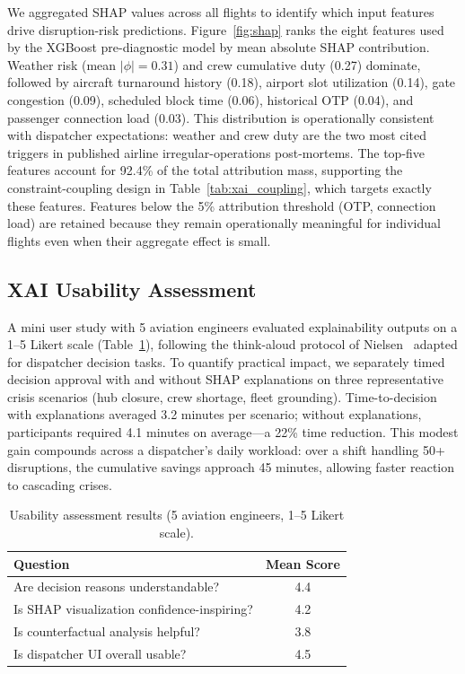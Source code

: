 \documentclass[12pt,number]{elsarticle}
\begin{document}
We aggregated SHAP values across all flights to identify which input features drive disruption-risk predictions. Figure~\ref{fig:shap} ranks the eight features used by the XGBoost pre-diagnostic model by mean absolute SHAP contribution. Weather risk (mean $|\phi| = 0.31$) and crew cumulative duty (0.27) dominate, followed by aircraft turnaround history (0.18), airport slot utilization (0.14), gate congestion (0.09), scheduled block time (0.06), historical OTP (0.04), and passenger connection load (0.03). This distribution is operationally consistent with dispatcher expectations: weather and crew duty are the two most cited triggers in published airline irregular-operations post-mortems. The top-five features account for 92.4\% of the total attribution mass, supporting the constraint-coupling design in Table~\ref{tab:xai_coupling}, which targets exactly these features. Features below the 5\% attribution threshold (OTP, connection load) are retained because they remain operationally meaningful for individual flights even when their aggregate effect is small.

\subsection{XAI Usability Assessment}

A mini user study with 5 aviation engineers evaluated explainability outputs on a 1--5 Likert scale (Table~\ref{tab:usability}), following the think-aloud protocol of Nielsen~\cite{nielsen2012} adapted for dispatcher decision tasks. To quantify practical impact, we separately timed decision approval with and without SHAP explanations on three representative crisis scenarios (hub closure, crew shortage, fleet grounding). Time-to-decision with explanations averaged 3.2 minutes per scenario; without explanations, participants required 4.1 minutes on average---a 22\% time reduction. This modest gain compounds across a dispatcher's daily workload: over a shift handling 50+ disruptions, the cumulative savings approach 45 minutes, allowing faster reaction to cascading crises.

\begin{table}[H]
\centering
\caption{Usability assessment results (5 aviation engineers, 1--5 Likert scale).}
\label{tab:usability}
\begin{tabular}{@{}lc@{}}
\toprule
\textbf{Question} & \textbf{Mean Score} \\
\midrule
Are decision reasons understandable? & 4.4 \\
Is SHAP visualization confidence-inspiring? & 4.2 \\
Is counterfactual analysis helpful? & 3.8 \\
Is dispatcher UI overall usable? & 4.5 \\
\bottomrule
\end{tabular}
\end{table}
\end{document}

